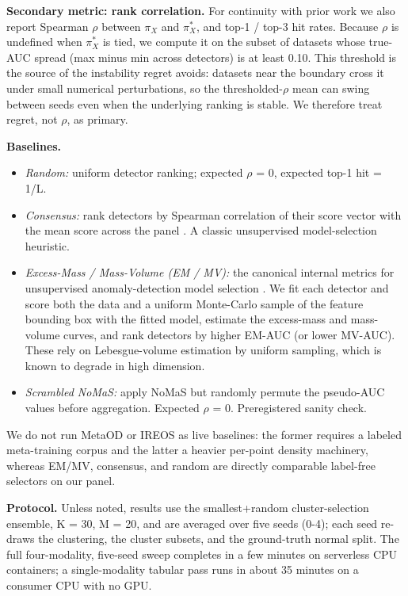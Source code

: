 \documentclass[3p,twocolumn]{elsarticle}
\begin{document}
\textbf{Secondary metric: rank correlation.} For continuity with prior work we also report Spearman $\rho$ between \(\pi_X\) and \(\pi_X^*\), and top-1 / top-3 hit rates. Because $\rho$ is undefined when \(\pi_X^*\) is tied, we compute it on the subset of datasets whose true-AUC spread (max minus min across detectors) is at least 0.10. This threshold is the source of the instability regret avoids: datasets near the boundary cross it under small numerical perturbations, so the thresholded-$\rho$ mean can swing between seeds even when the underlying ranking is stable. We therefore treat regret, not $\rho$, as primary.

\textbf{Baselines.}

\begin{itemize}
\tightlist
\item
  \emph{Random:} uniform detector ranking; expected $\rho$ = 0, expected top-1 hit = 1/L.
\item
  \emph{Consensus:} rank detectors by Spearman correlation of their score vector with the mean score across the panel \cite{ref4}. A classic unsupervised model-selection heuristic.
\item
  \emph{Excess-Mass / Mass-Volume (EM / MV):} the canonical internal metrics for unsupervised anomaly-detection model selection \cite{ref1}. We fit each detector and score both the data and a uniform Monte-Carlo sample of the feature bounding box with the fitted model, estimate the excess-mass and mass-volume curves, and rank detectors by higher EM-AUC (or lower MV-AUC). These rely on Lebesgue-volume estimation by uniform sampling, which is known to degrade in high dimension.
\item
  \emph{Scrambled NoMaS:} apply NoMaS but randomly permute the pseudo-AUC values before aggregation. Expected $\rho$ = 0. Preregistered sanity check.
\end{itemize}

We do not run MetaOD \cite{ref3} or IREOS \cite{ref2} as live baselines: the former requires a labeled meta-training corpus and the latter a heavier per-point density machinery, whereas EM/MV, consensus, and random are directly comparable label-free selectors on our panel.

\textbf{Protocol.} Unless noted, results use the smallest+random cluster-selection ensemble, K = 30, M = 20, and are averaged over five seeds (0-4); each seed re-draws the clustering, the cluster subsets, and the ground-truth normal split. The full four-modality, five-seed sweep completes in a few minutes on serverless CPU containers; a single-modality tabular pass runs in about 35 minutes on a consumer CPU with no GPU.
\end{document}
